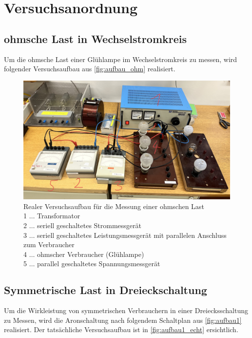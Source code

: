 \documentclass[12pt,english,ngerman]{scrartcl}
\begin{document}
\section{Versuchsanordnung}\label{sec:versuchsanordnung}

\subsection{ohmsche Last in Wechselstromkreis}

Um die ohmsche Last einer Glühlampe im Wechselstromkreis zu messen, wird
folgender Versuchsaufbau aus \autoref{fig:aufbau_ohm} realisiert.

\begin{figure}[H]
	\centering
	\includegraphics[width = 0.5\linewidth]{./figures/aufbau_ohm.png}
	\caption[Realer Versuchsaufbau für die Messung einer ohmschen Last]{Realer
		Versuchsaufbau für die Messung einer ohmschen Last \\
		1 \(\dots\) Transformator                          \\
		2 \(\dots\) seriell geschaltetes Strommessgerät    \\
		3 \(\dots\) seriell geschaltetes Leistungsmessgerät mit parallelen Anschluss
		zum Verbraucher                                    \\
		4 \(\dots\) ohmscher Verbraucher (Glühlampe)       \\
		5 \(\dots\) parallel geschaltetes Spannungsmessgerät
	}\label{fig:aufbau_ohm}
\end{figure}

\subsection{Symmetrische Last in Dreieckschaltung}

Um die Wirkleistung von symmetrischen Verbrauchern in einer Dreiecksschaltung
zu Messen, wird die Aronschaltung nach folgendem Schaltplan aus
\autoref{fig:aufbau1} realisiert. Der tatsächliche Versuchsaufbau ist in
\autoref{fig:aufbau1_echt} ersichtlich.
\end{document}
